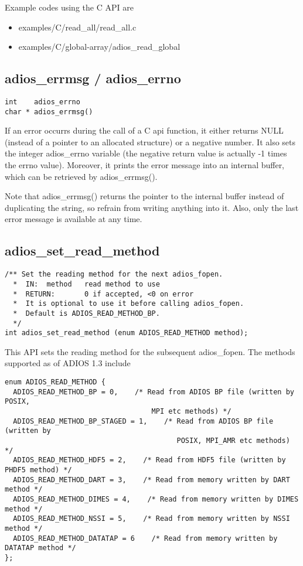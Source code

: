 Example codes using the C API are 

\begin{itemize}
\renewcommand{\labelitemi}{$-$}
\item examples/C/read\_all/read\_all.c

\item examples/C/global-array/adios\_read\_global
\end{itemize}

\subsection{adios\_errmsg / adios\_errno}

\begin{lstlisting}[]
int    adios_errno
char * adios_errmsg()
\end{lstlisting}

If an error occurrs during the call of a C api function, it either returns NULL 
(instead of a pointer to an allocated structure) or a negative number. It also 
sets the integer adios\_errno variable (the negative return value is actually -1 
times the errno value). Moreover, it prints the error message into an internal 
buffer, which can be retrieved by adios\_errmsg(). 

Note that adios\_errmsg() returns the pointer to the internal buffer instead of 
duplicating the string, so refrain from writing anything into it. Also, only the 
last error message is available at any time.

\subsection{adios\_set\_read\_method}
\begin{lstlisting}[]
/** Set the reading method for the next adios_fopen.
  *  IN:  method   read method to use
  *  RETURN:       0 if accepted, <0 on error
  *  It is optional to use it before calling adios_fopen. 
  *  Default is ADIOS_READ_METHOD_BP.
  */
int adios_set_read_method (enum ADIOS_READ_METHOD method);
\end{lstlisting}

This API sets the reading method for the subsequent adios\_fopen. The methods supported 
as of ADIOS 1.3 include

\begin{lstlisting}[]
enum ADIOS_READ_METHOD {
  ADIOS_READ_METHOD_BP = 0,    /* Read from ADIOS BP file (written by POSIX,
                                   MPI etc methods) */
  ADIOS_READ_METHOD_BP_STAGED = 1,    /* Read from ADIOS BP file (written by
                                         POSIX, MPI_AMR etc methods) */
  ADIOS_READ_METHOD_HDF5 = 2,    /* Read from HDF5 file (written by PHDF5 method) */
  ADIOS_READ_METHOD_DART = 3,    /* Read from memory written by DART method */
  ADIOS_READ_METHOD_DIMES = 4,    /* Read from memory written by DIMES method */
  ADIOS_READ_METHOD_NSSI = 5,    /* Read from memory written by NSSI method */
  ADIOS_READ_METHOD_DATATAP = 6    /* Read from memory written by DATATAP method */
};
\end{lstlisting}

